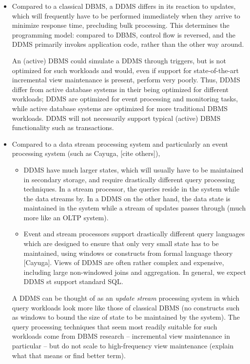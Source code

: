 \begin{itemize}
\item
Compared to a classical DBMS, a DDMS differs in its reaction to updates, which will frequently have to be performed immediately when they arrive to minimize response time, precluding bulk processing. This determines the programming model: compared to DBMS, control flow is reversed, and the DDMS primarily invokes application code, rather than the other way around.

An (active) DBMS could simulate a DDMS through triggers, but is not optimized for such workloads and would, even if support for state-of-the-art incremental view maintenance is present, perform very poorly. Thus, DDMS differ from active database systems in their being optimized for different workloads; DDMS are optimized for event processing and monitoring tasks, while active database systems are optimized for more traditional DBMS workloads. DDMS will not necessarily support typical (active) DBMS functionality such as transactions.

\item
Compared to a data stream processing system and particularly an event processing system (such as Cayuga, [cite others]),
   \begin{itemize}
   \item  DDMS have much larger states, which will usually have to be maintained in secondary storage, and require drastically different query processing techniques.
 In a stream processor, the queries reside in the system while the data streams by. In a DDMS on the other hand, the data state is maintained in the system while a stream of updates passes through (much more like an OLTP system).
    \item Event and stream processors support drastically different query languages which are designed to ensure that only very small state has to be maintained, using windows or constructs from formal language theory [Cayuga].  Views of DDMS are often rather complex and expensive, including large non-windowed joins and aggregation. In general, we expect DDMS st support standard SQL.
    \end{itemize}

A DDMS can be thought of as an {\em update stream}\/ processing system in which query workloads look more like those of classical DBMS (no constructs such as windows to bound the size of state to be maintained by the system). The query processing techniques that seem most readily suitable for such workloads come from DBMS research -- incremental view maintenance in particular -- but do not scale to high-frequency view maintenance (explain what that means or find better term).
\end{itemize}


